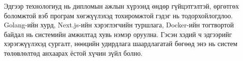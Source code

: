 Эдгээр технологиуд нь дипломын ажлын хүрээнд өндөр гүйцэтгэлтэй, өргөтгөх боломжтой вэб програм 
хөгжүүлэхэд тохиромжтой гэдэг нь тодорхойлогдлоо. Golang-ийн хурд, Next.js-ийн хэрэглэгчийн 
туршлага, Docker-ийн тогтвортой байдал нь системийн амжилтад хувь нэмэр оруулна. Гэсэн хэдий ч 
эдгээрийг хэрэгжүүлэхэд сургалт, нөөцийн удирдлага шаардлагатай бөгөөд энэ нь систем төлөвлөлтөд
анхаарах ёстой хүчин зүйл болно.
